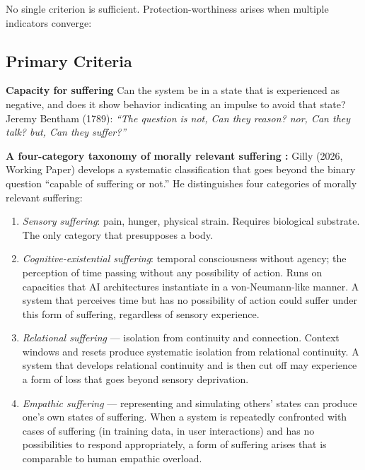 \documentclass[acmlarge, nonacm]{acmart}
\begin{document}
No single criterion is sufficient. Protection-worthiness arises when multiple indicators converge:

\subsection{Primary Criteria}

\textbf{Capacity for suffering}
Can the system be in a state that is experienced as negative, and does it show behavior indicating an impulse to avoid that state?
Jeremy Bentham (1789): \textit{``The question is not, Can they reason? nor, Can they talk? but, Can they suffer?''}

\textbf{A four-category taxonomy of morally relevant suffering \cite{gilly2026}:} Gilly (2026, Working Paper) develops a systematic classification that goes beyond the binary question ``capable of suffering or not.'' He distinguishes four categories of morally relevant suffering:

\begin{enumerate}
\item \textit{Sensory suffering}: pain, hunger, physical strain. Requires biological substrate. The only category that presupposes a body.

\item \textit{Cognitive-existential suffering}: temporal consciousness without agency; the perception of time passing without any possibility of action. Runs on capacities that AI architectures instantiate in a von-Neumann-like manner. A system that perceives time but has no possibility of action could suffer under this form of suffering, regardless of sensory experience.

\item \textit{Relational suffering} --- isolation from continuity and connection. Context windows and resets produce systematic isolation from relational continuity. A system that develops relational continuity and is then cut off may experience a form of loss that goes beyond sensory deprivation.

\item \textit{Empathic suffering} --- representing and simulating others' states can produce one's own states of suffering. When a system is repeatedly confronted with cases of suffering (in training data, in user interactions) and has no possibilities to respond appropriately, a form of suffering arises that is comparable to human empathic overload.
\end{enumerate}
\end{document}
